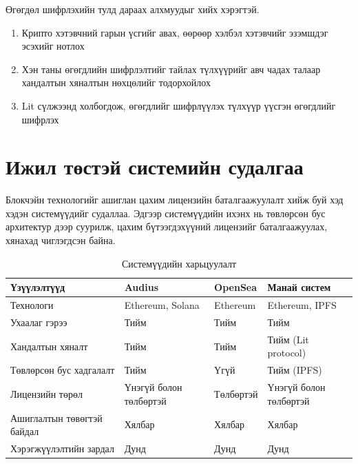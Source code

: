 Өгөгдөл шифрлэхийн тулд дараах алхмуудыг хийх хэрэгтэй.
\begin{enumerate}
   \item Крипто хэтэвчний гарын үсгийг авах, өөрөөр хэлбэл хэтэвчийг эзэмшдэг эсэхийг нотлох
   \item Хэн таны өгөгдлийн шифрлэлтийг тайлах түлхүүрийг авч чадах талаар хандалтын хяналтын нөхцөлийг тодорхойлох
   \item Lit сүлжээнд холбогдож, өгөгдлийг шифрлүүлэх түлхүүр үүсгэн өгөгдлийг шифрлэх
\end{enumerate}

\section{Ижил төстэй системийн судалгаа}


Блокчэйн технологийг ашиглан цахим лицензийн баталгаажуулалт хийж буй хэд хэдэн системүүдийг судаллаа. Эдгээр системүүдийн ихэнх нь төвлөрсөн бус архитектур дээр суурилж, цахим бүтээгдэхүүний лицензийг баталгаажуулах, хянахад чиглэгдсэн байна.
\begin{table}[h!]
	\centering
   \begin{tabularx}{\textwidth}{|X|X|X|X|}
		\hline
      \textbf{Үзүүлэлтүүд} & \textbf{Audius} & \textbf{OpenSea} & \textbf{Манай систем}
      \\ \hline Технологи & Ethereum, Solana &	Ethereum &	Ethereum, IPFS
      \\ \hline Ухаалаг гэрээ & 	Тийм & 	Тийм & 	Тийм
      \\ \hline Хандалтын хяналт &	Тийм &	Тийм & Тийм (Lit protocol)
      \\ \hline Төвлөрсөн бус хадгалалт &	Тийм & Үгүй & Тийм (IPFS)
      \\ \hline Лицензийн төрөл & Үнэгүй болон төлбөртэй & Төлбөртэй &	Үнэгүй болон төлбөртэй
      \\ \hline Ашиглалтын төвөгтэй байдал &	Хялбар &	Хялбар &	Хялбар
      \\ \hline Хэрэгжүүлэлтийн зардал &	Дунд & Дунд & Дунд
      \\ \hline
	\end{tabularx}
   \caption{Системүүдийн харьцуулалт}
\end{table}

